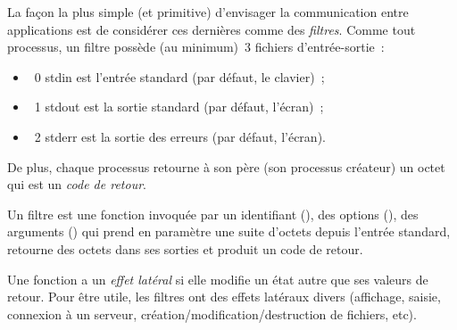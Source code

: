 \begin{frame}
  La fa\c{c}on la plus simple (et primitive) d'envisager la
  communication entre applications est de consid\'erer ces
  derni\`eres comme des \emph{filtres}.  Comme tout processus, un
  filtre poss\`ede (au minimum)~$3$ fichiers d'entr\'ee-sortie~:
  \begin{itemize}
  \item~0 stdin est l'entr\'ee standard (par d\'efaut, le clavier)~;
  \item~1 stdout est la sortie standard (par d\'efaut, l'\'ecran)~;
  \item~2 stderr est la sortie des erreurs (par d\'efaut, l'\'ecran).
  \end{itemize}
  De plus, chaque processus retourne \`a son p\`ere (son processus
  cr\'eateur) un octet qui est un \emph{code de retour}.
  \par\smallskip
  Un filtre est une fonction invoqu\'ee par un identifiant
  (), des options (), des arguments
  () qui prend en param\`etre une suite d'octets depuis
  l'entr\'ee standard, retourne des octets dans ses sorties et produit
  un code de retour.
  \par\smallskip
  Une fonction a un \emph{effet lat\'eral} si elle modifie un \'etat
  autre que ses valeurs de retour.  Pour \^etre utile, les filtres ont
  des effets lat\'eraux divers (affichage, saisie, connexion \`a un
  serveur, cr\'eation/modification/destruction de fichiers, etc).
\end{frame}
